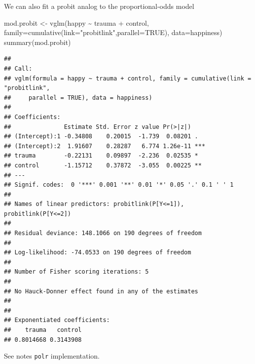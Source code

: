\documentclass[
  ignorenonframetext,
]{beamer}
\newenvironment{Shaded}{\begin{snugshade}}{\end{snugshade}}
\newcommand{\AttributeTok}[1]{\textcolor[rgb]{0.77,0.63,0.00}{#1}}
\newcommand{\ConstantTok}[1]{\textcolor[rgb]{0.00,0.00,0.00}{#1}}
\newcommand{\FunctionTok}[1]{\textcolor[rgb]{0.00,0.00,0.00}{#1}}
\newcommand{\NormalTok}[1]{#1}
\newcommand{\OtherTok}[1]{\textcolor[rgb]{0.56,0.35,0.01}{#1}}
\newcommand{\SpecialCharTok}[1]{\textcolor[rgb]{0.00,0.00,0.00}{#1}}
\newcommand{\StringTok}[1]{\textcolor[rgb]{0.31,0.60,0.02}{#1}}
\begin{document}
\begin{frame}[fragile]{}
\protect\hypertarget{section-10}{}
We can also fit a probit analog to the proportional-odds model

\vspace{12pt}
\tiny

\begin{Shaded}
\begin{Highlighting}[]
\NormalTok{mod.probit }\OtherTok{\textless{}{-}} \FunctionTok{vglm}\NormalTok{(happy }\SpecialCharTok{\textasciitilde{}}\NormalTok{ trauma }\SpecialCharTok{+}\NormalTok{ control,}
                   \AttributeTok{family=}\FunctionTok{cumulative}\NormalTok{(}\AttributeTok{link=}\StringTok{"probitlink"}\NormalTok{,}\AttributeTok{parallel=}\ConstantTok{TRUE}\NormalTok{),}
                   \AttributeTok{data=}\NormalTok{happiness)}
\FunctionTok{summary}\NormalTok{(mod.probit)}
\end{Highlighting}
\end{Shaded}

\begin{verbatim}
## 
## Call:
## vglm(formula = happy ~ trauma + control, family = cumulative(link = "probitlink", 
##     parallel = TRUE), data = happiness)
## 
## Coefficients: 
##               Estimate Std. Error z value Pr(>|z|)    
## (Intercept):1 -0.34808    0.20015  -1.739  0.08201 .  
## (Intercept):2  1.91607    0.28287   6.774 1.26e-11 ***
## trauma        -0.22131    0.09897  -2.236  0.02535 *  
## control       -1.15712    0.37872  -3.055  0.00225 ** 
## ---
## Signif. codes:  0 '***' 0.001 '**' 0.01 '*' 0.05 '.' 0.1 ' ' 1
## 
## Names of linear predictors: probitlink(P[Y<=1]), probitlink(P[Y<=2])
## 
## Residual deviance: 148.1066 on 190 degrees of freedom
## 
## Log-likelihood: -74.0533 on 190 degrees of freedom
## 
## Number of Fisher scoring iterations: 5 
## 
## No Hauck-Donner effect found in any of the estimates
## 
## 
## Exponentiated coefficients:
##    trauma   control 
## 0.8014668 0.3143908
\end{verbatim}
\end{frame}

\begin{frame}{}
\protect\hypertarget{section-11}{}
See notes \texttt{polr} implementation.
\end{frame}
\end{document}
